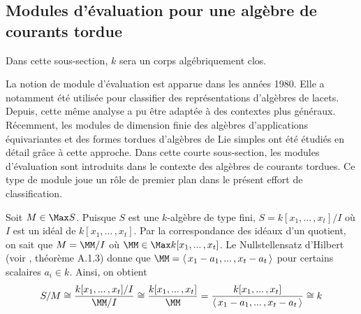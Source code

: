 

%
\subsection{Modules d'évaluation pour une algèbre de courants tordue}

Dans cette sous-section, $k$ sera un corps algébriquement clos.

La notion de module d'évaluation est apparue dans les années 1980. Elle a notamment été utilisée pour classifier des représentations d'algèbres de lacets. Depuis, cette même analyse a pu être adaptée à des contextes plus généraux. Récemment, les modules de dimension finie des algèbres d'applications équivariantes et des formes tordues d'algèbres de Lie simples ont été étudiés en détail grâce à cette approche. Dans cette courte sous-section, les modules d'évaluation sont introduits dans le contexte des algèbres de courants tordues. Ce type de module joue un rôle de premier plan dans le présent effort de classification.

Soit $M \in \Max S$. Puisque $S$ est une $k$-algèbre de type fini, $S = k[x_1,...\,,x_t] / I$ où $I$ est un idéal de $k[x_1,...\,,x_t]$. Par la correspondance des idéaux d'un quotient, on sait que $M = \MM/I$ où $\MM \in \Max k[x_1,...\,,x_t]$. Le Nullstellensatz d'Hilbert (voir \cite{GWsym}, théorème A.1.3) donne que $\MM = \langle \, x_1-a_1,...\,,x_t-a_t \, \rangle$ pour certains scalaires $a_i \in k$. Ainsi, on obtient
\begin{equation} \label{résidu} 
S / M \cong \frac{k[x_1,...\,,x_t]/I}{\MM/I} \cong \frac{k[x_1,...\,,x_t]}{\MM} = \frac{k[x_1,...\,,x_t]}{\langle \, x_1-a_1,...\,,x_t-a_t \, \rangle} \cong k
\end{equation}


